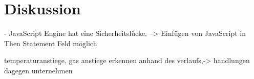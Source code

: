 \chapter{Diskussion}

- JavaScript Engine hat eine Sicherheitslücke. --> Einfügen von JavaScript in Then Statement Feld möglich

temperaturanstiege, gas anstiege erkennen anhand des verlaufs,-> handlungen dagegen unternehmen